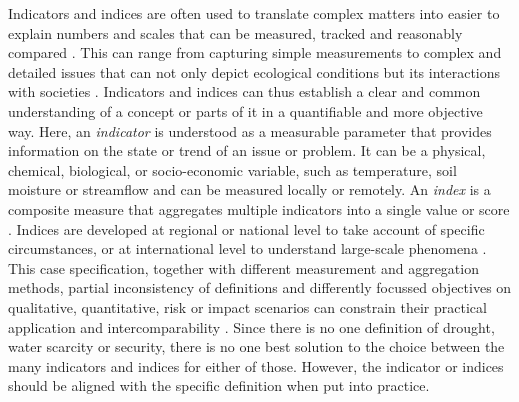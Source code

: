 Indicators and indices are often used to translate complex matters into easier to explain numbers and scales that can be measured, tracked and reasonably compared \autocite{blauveltSystematizingEnvironmentalIndicators2014,williamsUsingIndicatorsExplain2017}. This can range from capturing simple measurements to complex and detailed issues that can not only depict ecological conditions but its interactions with societies \autocite{blauveltSystematizingEnvironmentalIndicators2014,mishraWaterSecurityChanging2021}. Indicators and indices can thus establish a clear and common understanding of a concept or parts of it in a quantifiable and more objective way.\newline
Here, an \textit{indicator} is understood as a measurable parameter that provides information on the state or trend of an issue or problem. It can be a physical, chemical, biological, or socio-economic variable, such as temperature, soil moisture or streamflow and can be measured locally or remotely. An \textit{index} is a composite measure that aggregates multiple indicators into a single value or score \autocite{unitednationsuniversityTooManyIndicators2017,williamsUsingIndicatorsExplain2017, svobodaHandbookDroughtIndicators2016}. Indices are developed at regional or national level to take account of specific circumstances, or at international level to understand large-scale phenomena \autocite{unitednationsuniversityTooManyIndicators2017}. This case specification, together with different measurement and aggregation methods, partial inconsistency of definitions and differently focussed objectives on qualitative, quantitative, risk or impact scenarios can constrain their practical application and intercomparability \autocite{svobodaHandbookDroughtIndicators2016,unitednationsuniversityTooManyIndicators2017}. Since there is no one definition of drought, water scarcity or security, there is no one best solution to the choice between the many indicators and indices for either of those. However, the indicator or indices should be aligned with the specific definition when put into practice.


